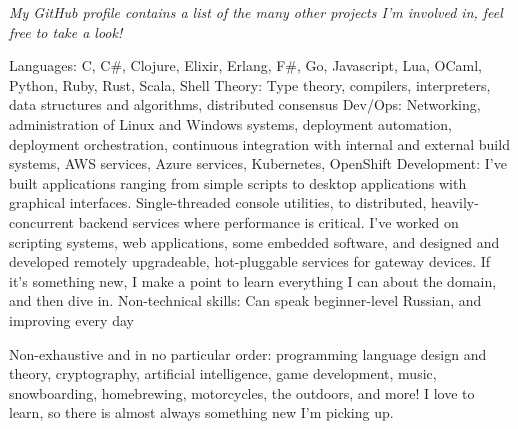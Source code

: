 \documentclass[10pt,a4paper]{article}
\begin{document}
\vspace{-0.2em}
\begin{center}
  \emph{\small My GitHub profile contains a list of the many other projects I'm involved in, feel free to take a look!}
\end{center}

\spacedhrule{-0.2em}{-0.4em}


\inlineheadsection  %
  {Languages:}
  {C, C\#, Clojure, Elixir, Erlang, F\#, Go, Javascript, Lua, OCaml, Python, Ruby, Rust, Scala, Shell}
\inlineheadsection
  {Theory:}
  {Type theory, compilers, interpreters, data structures and algorithms, distributed consensus}
\inlineheadsection
  {Dev/Ops:}
  {Networking, administration of Linux and Windows systems, deployment automation, deployment orchestration, continuous integration with internal and external build systems, AWS services, Azure services, Kubernetes, OpenShift}
\inlineheadsection
  {Development:}
  {I've built applications ranging from simple scripts to desktop applications with graphical interfaces. Single-threaded console utilities, to distributed, heavily-concurrent backend services where performance is critical. I've worked on scripting systems, web applications, some embedded software, and designed and developed remotely upgradeable, hot-pluggable services for gateway devices. If it's something new, I make a point to learn everything I can about the domain, and then dive in.}
\inlineheadsection
  {Non-technical skills:}
  {Can speak beginner-level Russian, and improving every day}


\inlineheadsection
  {Non-exhaustive and in no particular order:}
  {programming language design and theory, cryptography, artificial intelligence, game development, music, snowboarding, homebrewing, motorcycles, the outdoors, and more! I love to learn, so there is almost always something new I'm picking up.}
\end{document}
